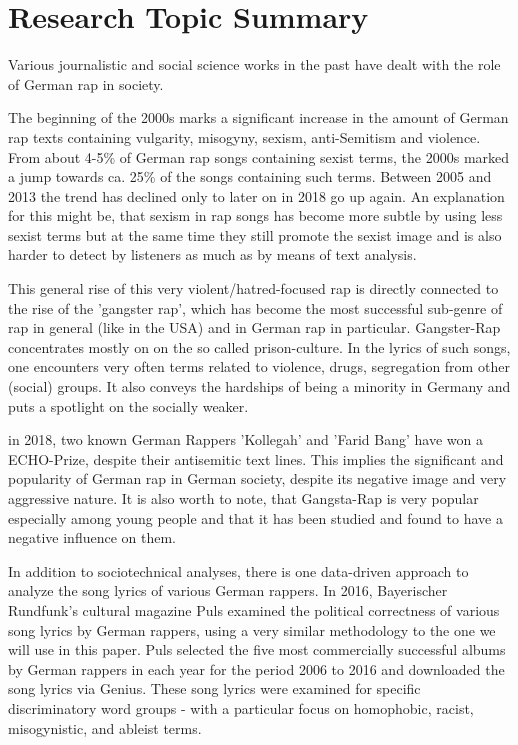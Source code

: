 \section{Research Topic Summary}\label{sec:research}

Various journalistic and social science works in the past have dealt with the role of German rap in society.

The beginning of the 2000s marks a significant increase in the amount of German rap texts containing vulgarity, misogyny, sexism, anti-Semitism and violence. From about 4-5\% of German rap songs containing sexist terms, the 2000s marked a jump towards ca. 25\% of the songs containing such terms. Between 2005 and 2013 the trend has declined only to later on in 2018 go up again. An explanation for this might be, that sexism in rap songs has become more subtle by using less sexist terms but at the same time they still promote the sexist image and is also harder to detect by listeners as much as by means of text analysis. \cite{rohwer_2020}

This general rise of this very violent/hatred-focused rap is directly connected to the rise of the 'gangster rap', which has become the most successful sub-genre of rap in general (like in the USA) and in German rap in particular.
Gangster-Rap concentrates mostly on on the so called prison-culture. In the lyrics of such songs, one encounters very often terms related to violence, drugs, segregation from other (social) groups. It also conveys the hardships of being a minority in Germany and puts a spotlight on the socially weaker. \cite{wiegangsta}

in 2018, two known German Rappers 'Kollegah' and 'Farid Bang' have won a ECHO-Prize, despite their antisemitic text lines. \cite{kollegahfarid}
This implies the significant and popularity of German rap in German society, despite its negative image and very aggressive nature. It is also worth to note, that Gangsta-Rap is very popular especially among young people and that it has been studied and found to have a negative influence on them. \cite{jugendeinfluss, bielefeld_studie,salomo_greven_2021}

In addition to sociotechnical analyses, there is one data-driven approach to analyze the song lyrics of various German rappers. In 2016, Bayerischer Rundfunk's cultural magazine Puls \cite{puls_2016} examined the political correctness of various song lyrics by German rappers, using a very similar methodology to the one we will use in this paper. Puls selected the five most commercially successful albums by German rappers in each year for the period 2006 to 2016 and downloaded the song lyrics via Genius. These song lyrics were examined for specific discriminatory word groups - with a particular focus on homophobic, racist, misogynistic, and ableist terms.

